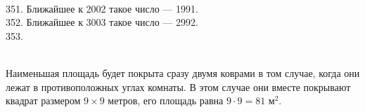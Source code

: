 \documentclass[12pt]{article}
\begin{document}
\begin{figure}[ht!]
\end{figure}\\
351. Ближайшее к 2002 такое число --- 1991.\\
352. Ближайшее к 3003 такое число --- 2992.\\
353. \begin{figure}[ht!]
\end{figure}\\
Наименьшая площадь будет покрыта сразу двумя коврами в том случае, когда они лежат в противоположных углах комнаты. В этом случае они вместе покрывают квадрат размером $9\times9$ метров, его площадь равна $9\cdot9=81\text{ м}^2.$\newpage\noindent
\end{document}
